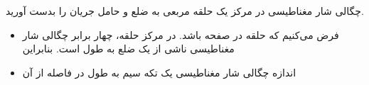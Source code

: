 \begin{ELexample}{}
\begin{ELsolution}
\end{ELsolution}

\end{ELexample}


\begin{ELexample}{}

چگالی شار مغناطیسی در مرکز یک حلقه مربعی به ضلع  و حامل جریان  را بدست آورید.


\begin{ELsolution}

\begin{itemize}
\tightlist
\item
  فرض می‌کنیم که حلقه در صفحه  باشد.  در مرکز حلقه، چهار برابر چگالی شار مغناطیسی ناشی از یک ضلع به طول  است. بنابراین
\item
  اندازه چگالی شار مغناطیسی یک تکه سیم به طول  در فاصله  از آن
\end{itemize}


\end{ELsolution}

\end{ELexample}



